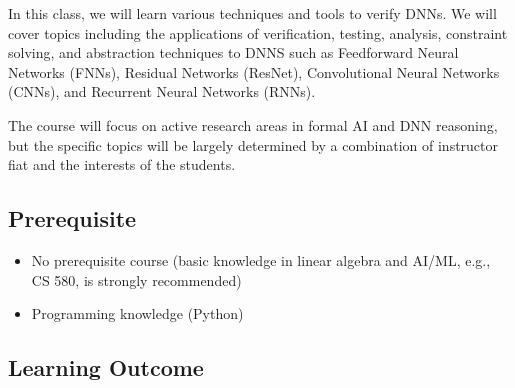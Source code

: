 \documentclass[11pt]{article}
\begin{document}
In this class, we will learn various techniques and tools to verify DNNs. We will cover topics including the applications
of verification, testing, analysis, constraint solving, and abstraction
techniques to DNNS such as Feedforward Neural Networks
(FNNs), Residual Networks (ResNet), Convolutional Neural Networks
(CNNs), and Recurrent Neural Networks (RNNs).

The course will focus on active research areas in formal AI and DNN reasoning,
but the specific topics will be largely determined by a
combination of instructor fiat and the interests of the students.




\subsection{Prerequisite}
\begin{itemize}
\item No prerequisite course (basic knowledge in linear algebra and AI/ML, e.g., CS 580, is strongly recommended)
\item Programming knowledge (Python)
\end{itemize}



\subsection{Learning Outcome}
\end{document}
